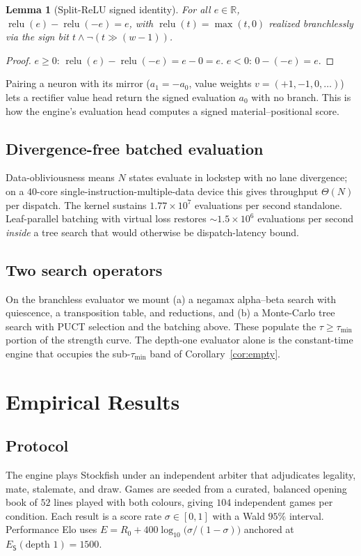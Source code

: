 \documentclass[11pt,oneside]{book}
\theoremstyle{definition}
\theoremstyle{plain}
\newtheorem{lemma}{Lemma}[chapter]
\theoremstyle{remark}
\newcommand{\Elo}{E}
\newcommand{\Search}{\mathsf{S}}
\newcommand{\budget}{\tau}
\newcommand{\score}{\sigma}
\newcommand{\Reals}{\mathbb{R}}
\newcommand{\relu}{\operatorname{relu}}
\begin{document}
\begin{lemma}[Split-ReLU signed identity]\label{lem:crelu}
For all $e\in\Reals$, $\relu(e)-\relu(-e)=e$, with $\relu(t)=\max(t,0)$ realized
branchlessly via the sign bit $t\wedge\neg(t\gg(w{-}1))$.
\end{lemma}
\begin{proof}
$e\ge0$: $\relu(e)-\relu(-e)=e-0=e$. $e<0$: $0-(-e)=e$.
\end{proof}

Pairing a neuron with its mirror ($a_1=-a_0$, value weights $v=(+1,-1,0,\dots)$) lets a
rectifier value head return the signed evaluation $a_0$ with no branch. This is how the
engine's evaluation head computes a signed material--positional score.

\section{Divergence-free batched evaluation}
Data-obliviousness means $N$ states evaluate in lockstep with no lane divergence; on a
$40$-core single-instruction-multiple-data device this gives throughput $\Theta(N)$ per
dispatch. The kernel sustains $1.77\times10^{7}$ evaluations per second standalone.
Leaf-parallel batching with virtual loss restores $\sim 1.5\times10^{6}$ evaluations per
second \emph{inside} a tree search that would otherwise be dispatch-latency bound.

\section{Two search operators}
On the branchless evaluator we mount (a) a negamax alpha--beta search with quiescence, a
transposition table, and reductions, and (b) a Monte-Carlo tree search with PUCT selection
and the batching above. These populate the $\budget\ge\budget_{\min}$ portion of the
strength curve. The depth-one evaluator alone is the constant-time engine that occupies the
sub-$\budget_{\min}$ band of Corollary~\ref{cor:empty}.

\chapter{Empirical Results}\label{ch:empirics}

\section{Protocol}
The engine plays Stockfish under an independent arbiter that adjudicates legality, mate,
stalemate, and draw. Games are seeded from a curated, balanced opening book of $52$ lines
played with both colours, giving $104$ independent games per condition. Each result is a
score rate $\score\in[0,1]$ with a Wald $95\%$ interval. Performance Elo uses
$\Elo=R_0+400\log_{10}\!\big(\score/(1-\score)\big)$ anchored at
$\Elo_\Search(\text{depth }1)=1500$.
\end{document}
